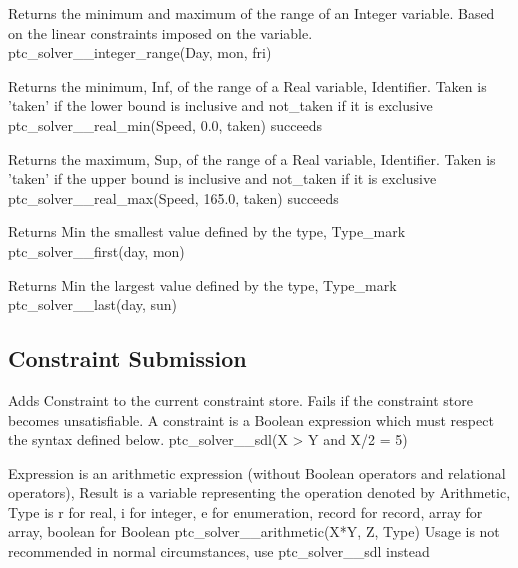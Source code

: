\documentclass{article}
\begin{document}
\hspace{\parindent}
        {Returns the minimum and maximum of the range of an Integer variable.
Based on the linear constraints imposed on the variable.}
        {ptc\_solver\_\_integer\_range(Day, mon, fri)}
        {}

        {Returns the minimum, Inf, of the range of a Real variable, Identifier.
Taken is 'taken' if the lower bound is inclusive and not\_taken if it is
exclusive}
        {ptc\_solver\_\_real\_min(Speed, 0.0, taken) succeeds}
        {}

        {Returns the maximum, Sup, of the range of a Real variable, Identifier.
Taken is 'taken' if the upper bound is inclusive and not\_taken if it is
exclusive}
        {ptc\_solver\_\_real\_max(Speed, 165.0, taken) succeeds}
        {}

        {Returns Min the smallest value defined by the type, Type\_mark}
        {ptc\_solver\_\_first(day, mon)}
        {}

        {Returns Min the largest value defined by the type, Type\_mark}
        {ptc\_solver\_\_last(day, sun)}
        {}

\subsection{Constraint Submission}

\hspace{\parindent}
    {Adds Constraint to the current constraint store. Fails if the constraint
store
    becomes unsatisfiable. A constraint is a Boolean expression which must
respect
    the syntax defined below.}
    {ptc\_solver\_\_sdl(X > Y and X/2 = 5)}
    {}

        {Expression is an arithmetic expression (without Boolean operators and
relational operators), Result is a variable representing the operation denoted by
Arithmetic, Type is r for real, i for integer, e
for enumeration, record for record, array for array, boolean for Boolean}
        {ptc\_solver\_\_arithmetic(X*Y, Z, Type)}
        {Usage is not recommended in normal circumstances, use ptc\_solver\_\_sdl
instead}
\end{document}
